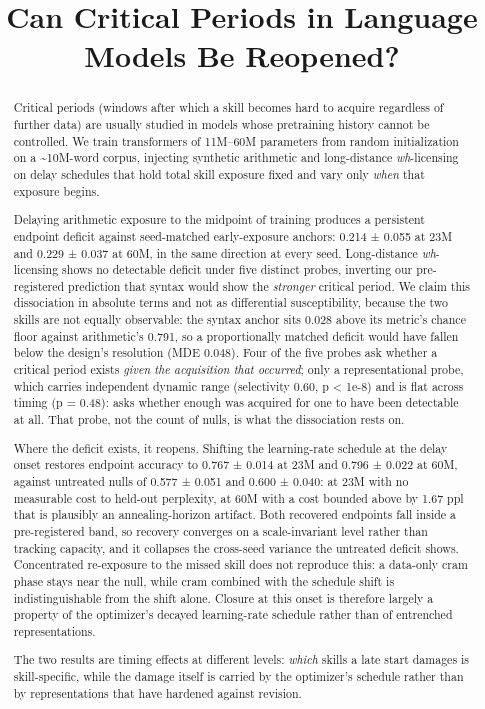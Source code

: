 \documentclass[11pt]{article}
\title{Can Critical Periods in Language Models Be Reopened?}
\author{}
\begin{document}
\maketitle
\begin{abstract}
Critical periods (windows after which a skill becomes hard to acquire regardless of
further data) are usually studied in models whose pretraining history cannot be
controlled. We train transformers of 11M--60M parameters from random initialization on a
\textasciitilde10M-word corpus, injecting synthetic arithmetic and long-distance \emph{wh}-licensing on
delay schedules that hold total skill exposure fixed and vary only \emph{when} that exposure
begins.

Delaying arithmetic exposure to the midpoint of training produces a persistent
endpoint deficit against seed-matched early-exposure anchors: 0.214 ± 0.055 at 23M and
0.229 ± 0.037 at 60M, in the same direction at every seed. Long-distance \emph{wh}-licensing
shows no detectable deficit under five distinct probes, inverting our pre-registered
prediction that syntax would show the \emph{stronger} critical period. We claim this
dissociation in absolute terms and not as differential susceptibility, because the two
skills are not equally observable: the syntax anchor sits 0.028 above its metric's
chance floor against arithmetic's 0.791, so a proportionally matched deficit would have
fallen below the design's resolution (MDE 0.048). Four of the five probes ask whether a
critical period exists \emph{given the acquisition that occurred}; only a representational
probe, which carries independent dynamic range (selectivity 0.60, p \textless{} 1e-8) and is flat
across timing (p = 0.48): asks whether enough was acquired for one to have been
detectable at all. That probe, not the count of nulls, is what the dissociation rests on.

Where the deficit exists, it reopens. Shifting the learning-rate schedule at the delay
onset restores endpoint accuracy to 0.767 ± 0.014 at 23M and 0.796 ± 0.022 at 60M,
against untreated nulls of 0.577 ± 0.051 and 0.600 ± 0.040: at 23M with no measurable
cost to held-out perplexity, at 60M with a cost bounded above by 1.67 ppl that is
plausibly an annealing-horizon artifact. Both recovered endpoints fall inside a
pre-registered band, so recovery converges on a scale-invariant level rather than
tracking capacity, and it collapses the cross-seed variance the untreated deficit shows.
Concentrated re-exposure to the missed skill does not reproduce this: a data-only cram
phase stays near the null, while cram combined with the schedule shift is
indistinguishable from the shift alone. Closure at this onset is therefore largely a
property of the optimizer's decayed learning-rate schedule rather than of entrenched
representations.

The two results are timing effects at different levels: \emph{which} skills a late start
damages is skill-specific, while the damage itself is carried by the optimizer's
schedule rather than by representations that have hardened against revision.

\end{abstract}
\end{document}
